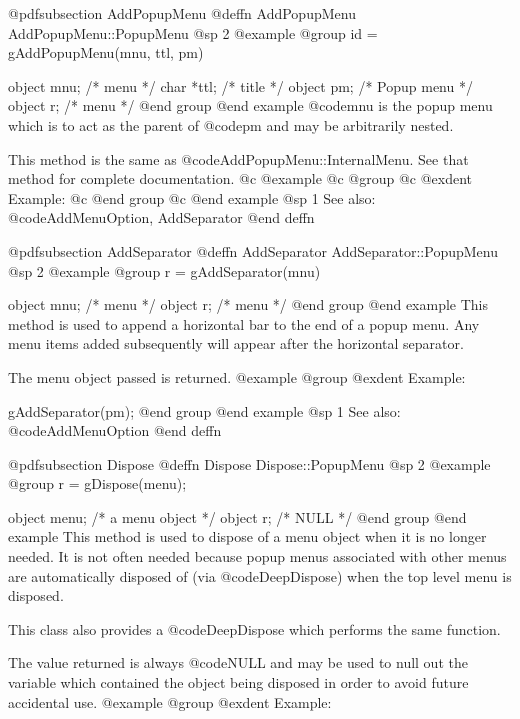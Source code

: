 @pdfsubsection {AddPopupMenu}
@deffn {AddPopupMenu} AddPopupMenu::PopupMenu
@sp 2
@example
@group
id = gAddPopupMenu(mnu, ttl, pm)

object  mnu;    /*  menu        */
char    *ttl;   /*  title       */
object  pm;     /*  Popup menu  */
object  r;      /*  menu        */
@end group
@end example
@code{mnu} is the popup menu which is to act as the parent of @code{pm}
and may be arbitrarily nested.

This method is the same as @code{AddPopupMenu::InternalMenu}.  See that
method for complete documentation.
@c @example
@c @group
@c @exdent Example:
@c @end group
@c @end example
@sp 1
See also:  @code{AddMenuOption, AddSeparator}
@end deffn










@pdfsubsection {AddSeparator}
@deffn {AddSeparator} AddSeparator::PopupMenu
@sp 2
@example
@group
r = gAddSeparator(mnu)

object  mnu;    /*  menu        */
object  r;      /*  menu        */
@end group
@end example
This method is used to append a horizontal bar to the end of a popup
menu.  Any menu items added subsequently will appear after the
horizontal separator.

The menu object passed is returned.
@example
@group
@exdent Example:

gAddSeparator(pm);
@end group
@end example
@sp 1
See also:  @code{AddMenuOption}
@end deffn











@pdfsubsection {Dispose}
@deffn {Dispose} Dispose::PopupMenu
@sp 2
@example
@group
r = gDispose(menu);

object  menu;   /*  a menu object   */
object  r;      /*  NULL            */
@end group
@end example
This method is used to dispose of a menu object when it is no longer
needed.  It is not often needed because popup menus associated with
other menus are automatically disposed of (via @code{DeepDispose}) when
the top level menu is disposed.

This class also provides a @code{DeepDispose} which performs the same
function.

The value returned is always @code{NULL} and may be used to null out
the variable which contained the object being disposed in order to
avoid future accidental use.
@example
@group
@exdent Example:

